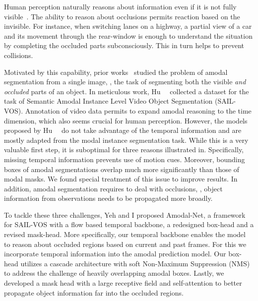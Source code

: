 

Human perception naturally reasons about information even if it is not fully visible~\cite{palmer1999vision}. The ability to reason about occlusions permits reaction based on the invisible. %
For instance, when switching lanes on a highway, a partial view of a car and its movement through the rear-window is enough to understand the situation by completing the occluded parts subconsciously. This in turn helps to prevent collisions. 



Motivated by this capability, prior works~\cite{GuoECCV2012, SilbermanECCV2014b, KarICCV2015, LiECCV2016, zhu2017semantic, ehsani2018segan, follmann2019learning} studied the problem of amodal segmentation from a single image, \ie, the task of segmenting  both the visible \textit{and occluded} parts of an object.  
In meticulous work, Hu~\etal~\cite{hu2019sail} collected a dataset for  the task of Semantic Amodal Instance Level Video Object Segmentation (SAIL-VOS). Annotation of video data permits to expand amodal reasoning to the time dimension, which also seems crucial for human perception. However, the models proposed by Hu~\etal~\cite{hu2019sail} do not  take  advantage of the temporal information
and are mostly adapted from the modal instance segmentation task. 
While this is a very valuable first step, it is suboptimal for three reasons illustrated in. Specifically, missing temporal information prevents use of motion cues. Moreover, bounding boxes of amodal segmentations overlap much more significantly than those of modal masks. We found special treatment of this issue to improve results. In addition, amodal segmentation requires to deal with occlusions, \ie, object information from observations needs to be propagated more broadly.

To tackle these three challenges, Yeh and I proposed Amodal-Net, a framework for SAIL-VOS with a flow based temporal backbone, a redesigned box-head and a revised mask-head. 
More specifically, our temporal backbone enables the model to reason about occluded regions based on current and past frames. For this we incorporate temporal information into the amodal prediction model. Our box-head utilizes a cascade architecture with soft Non-Maximum Suppression (NMS) to address the challenge of heavily overlapping amodal boxes. Lastly, we developed a mask head with a large receptive field and self-attention to better propagate object information far into the occluded regions. 

